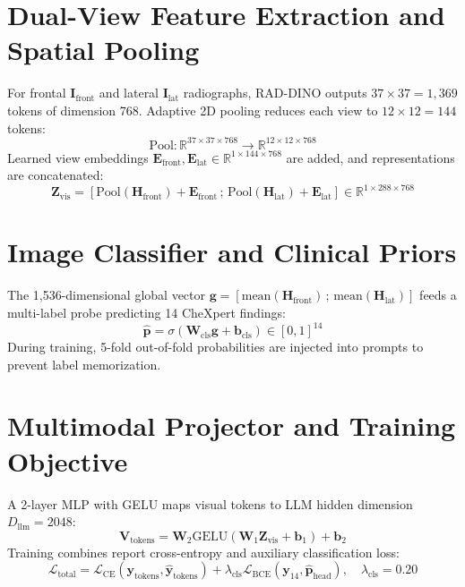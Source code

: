 \documentclass[12pt,a4paper]{report}
\begin{document}
\section{Dual-View Feature Extraction and Spatial Pooling}
For frontal $\mathbf{I}_{\text{front}}$ and lateral $\mathbf{I}_{\text{lat}}$ radiographs, RAD-DINO outputs $37 \times 37 = 1,369$ tokens of dimension 768. Adaptive 2D pooling reduces each view to $12 \times 12 = 144$ tokens:
\begin{equation}
\text{Pool} : \mathbb{R}^{37 \times 37 \times 768} \longrightarrow \mathbb{R}^{12 \times 12 \times 768}
\end{equation}
Learned view embeddings $\mathbf{E}_{\text{front}}, \mathbf{E}_{\text{lat}} \in \mathbb{R}^{1 \times 144 \times 768}$ are added, and representations are concatenated:
\begin{equation}
\mathbf{Z}_{\text{vis}} = [\text{Pool}(\mathbf{H}_{\text{front}}) + \mathbf{E}_{\text{front}} \,;\, \text{Pool}(\mathbf{H}_{\text{lat}}) + \mathbf{E}_{\text{lat}}] \in \mathbb{R}^{1 \times 288 \times 768}
\end{equation}

\section{Image Classifier and Clinical Priors}
The 1,536-dimensional global vector $\mathbf{g} = [\text{mean}(\mathbf{H}_{\text{front}}) \,;\, \text{mean}(\mathbf{H}_{\text{lat}})]$ feeds a multi-label probe predicting 14 CheXpert findings:
\begin{equation}
\hat{\mathbf{p}} = \sigma(\mathbf{W}_{\text{cls}}\mathbf{g} + \mathbf{b}_{\text{cls}}) \in [0, 1]^{14}
\end{equation}
During training, 5-fold out-of-fold probabilities are injected into prompts to prevent label memorization.

\section{Multimodal Projector and Training Objective}
A 2-layer MLP with GELU maps visual tokens to LLM hidden dimension $D_{\text{llm}} = 2048$:
\begin{equation}
\mathbf{V}_{\text{tokens}} = \mathbf{W}_2 \text{GELU}(\mathbf{W}_1 \mathbf{Z}_{\text{vis}} + \mathbf{b}_1) + \mathbf{b}_2
\end{equation}
Training combines report cross-entropy and auxiliary classification loss:
\begin{equation}
\mathcal{L}_{\text{total}} = \mathcal{L}_{\text{CE}}(\mathbf{y}_{\text{tokens}}, \hat{\mathbf{y}}_{\text{tokens}}) + \lambda_{\text{cls}} \mathcal{L}_{\text{BCE}}(\mathbf{y}_{14}, \hat{\mathbf{p}}_{\text{head}}), \quad \lambda_{\text{cls}} = 0.20
\end{equation}
\end{document}
